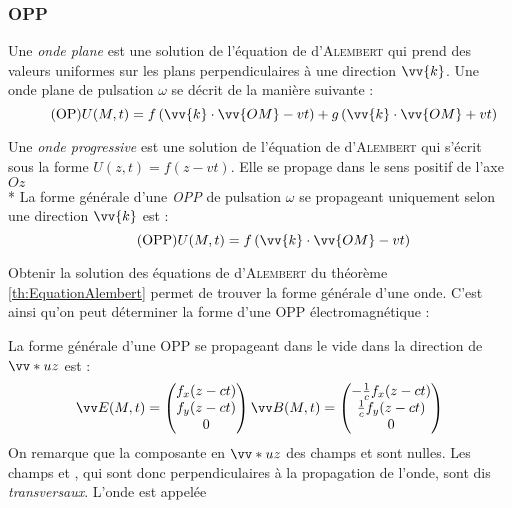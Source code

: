\documentclass[11pt,a4paper,fleqn,pdftex]{report}
\begin{document}
\subsubsection{\acrlong{OPP}} %
\label{ssub:onde_plane}
\begin{dfn}
   Une \emph{onde plane} est une solution  de l'équation de d'\textsc{Alembert} qui prend des valeurs uniformes sur les plans perpendiculaires à une direction $\vv{k}$.\newline
Une onde plane de pulsation $\omega$ se décrit de la manière suivante : 
\begin{equation}\tag{OP}
U(M,t) = f \left( \vv{k}\cdot\vv{OM} - vt \right) + g \left( \vv{k}\cdot\vv{OM} + vt \right)
\end{equation}
\end{dfn}
\begin{dfn}
   Une \emph{onde progressive} est une solution de l'équation de d'\textsc{Alembert} qui s'écrit sous la forme $U(z,t) = f(z - vt)$. Elle se propage dans le sens positif de l'axe $Oz$ \\*
La forme générale d'une \emph{\gls{OPP}} de pulsation $\omega$ se propageant uniquement selon une direction $\vv{k}$ est :
\begin{equation}\tag{OPP}
U(M,t) = f \left( \vv{k}\cdot\vv{OM} - vt \right)
\end{equation}
\end{dfn}
Obtenir la solution des équations de d'\textsc{Alembert} du théorème \ref{th:EquationAlembert} permet de trouver la forme générale d'une onde. C'est ainsi qu'on peut déterminer la forme d'une \gls{OPP} électromagnétique : 
\begin{itheorem}
   La forme générale d'une \acrfull{OPP} se propageant dans le vide dans la direction de $\vv*{u}{z}$ est :
   \begin{equation}
   \E (M,t) = \begin{pmatrix}
     f_x(z-ct) \\ f_y(z-ct) \\0
   \end{pmatrix}
   \\
   \B (M,t) = \begin{pmatrix}
     -\frac{1}{c}f_x(z-ct) \\ \frac{1}{c}f_y(z-ct) \\0
   \end{pmatrix}
   \end{equation}
  On remarque que la composante en $\vv*{u}{z}$ des champs \E{} et \B{} sont nulles. Les champs \E{} et \B{}, qui sont donc perpendiculaires à la propagation de l'onde, sont dis \emph{transversaux}. L'onde est appelée 
\end{itheorem}
\end{document}
